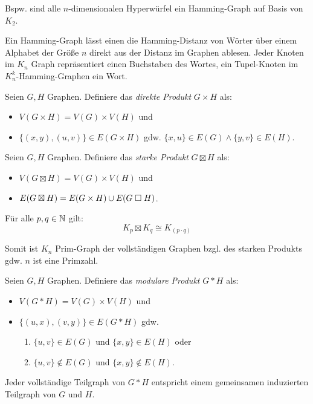\begin{remark}
    Bspw. sind alle $ n $-dimensionalen Hyperwürfel ein Hamming-Graph auf Basis von $ K_2 $.

    Ein Hamming-Graph lässt einen die Hamming-Distanz von Wörter über einem Alphabet der Größe $ n $ direkt aus der Distanz im Graphen ablesen.
    Jeder Knoten im $ K_n $ Graph repräsentiert einen Buchstaben des Wortes, ein Tupel-Knoten im $ K_n^k $-Hamming-Graphen ein Wort.
\end{remark}

\begin{definition}
    Seien $ G, H $ Graphen.
    Definiere das \textit{direkte Produkt} $ G \times H $ als:
    \begin{itemize}
        \item $ V(G \times H) = V(G) \times V(H) $ und
        \item $ \{ (x, y), (u, v) \} \in E(G \times H) $ gdw. $ \{ x, u\} \in E(G) \land \{ y, v \} \in E(H) $.
    \end{itemize}
\end{definition}

\begin{definition}
    Seien $ G, H $ Graphen.
    Definiere das \textit{starke Produkt} $ G \boxtimes H $ als:
    \begin{itemize}
        \item $ V(G \boxtimes H) = V(G) \times V(H) $ und
        \item $ E(G \boxtimes H) = E(G \times H) \cup E(G \mathrel{\square} H) $.
    \end{itemize}
\end{definition}

\begin{proposition}
    Für alle $ p, q \in \mathbb{N} $ gilt:
    \begin{equation*}
        K_p \boxtimes K_q \cong K_{(p \cdot q)}
    \end{equation*}

    Somit ist $ K_n $ Prim-Graph der vollständigen Graphen bzgl. des starken Produkts gdw. $ n $ ist eine Primzahl.
\end{proposition}

\begin{definition}
    Seien $ G, H $ Graphen.
    Definiere das \textit{modulare Produkt} $ G * H $ als:
    \begin{itemize}
        \item $ V(G * H) = V(G) \times V(H) $ und
        \item $ \{ (u, x), (v, y) \} \in E(G * H) $ gdw.
        \begin{enumerate}
            \item $ \{ u, v \} \in E(G) $ und $ \{ x, y \} \in E(H) $ oder
            \item $ \{ u, v \} \notin E(G) $ und $ \{ x, y \} \notin E(H) $.
        \end{enumerate}
    \end{itemize}
\end{definition}

\begin{remark}
    Jeder vollständige Teilgraph von $ G * H $ entspricht einem gemeinsamen induzierten Teilgraph von $ G $ und $ H $.
\end{remark}
